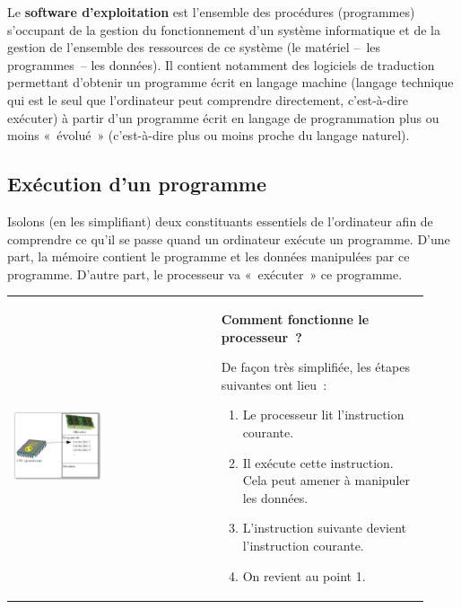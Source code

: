 			Le \textbf{software d’exploitation} 
			est l’ensemble des procédures (programmes) 
			s’occupant de la gestion du fonctionnement 
			d’un système informatique 
			et de la gestion de l’ensemble des ressources de ce système 
			(le matériel –~les programmes~– les données). 
			Il contient notamment des logiciels de traduction 
			permettant d’obtenir un programme écrit en langage machine 
			(langage technique qui est le seul que l’ordinateur 
			peut comprendre directement, c’est-à-dire exécuter) 
			à partir d’un programme écrit en langage de programmation 
			plus ou moins «~évolué~» 
			(c’est-à-dire plus ou moins proche du langage naturel).
	
		\subsection{Exécution d’un programme}
		
			Isolons (en les simplifiant) deux constituants essentiels de
			l’ordinateur afin de comprendre ce qu'il se passe quand un
			ordinateur exécute un programme.  D’une part, la mémoire contient le
			programme et les données manipulées par ce programme.  D’autre part,
			le processeur va «~exécuter~» ce programme.
	
			\begin{tabular}{m{0.46\linewidth}m{0.46\linewidth}}
				\begin{center}
				\includegraphics[width=0.45\textwidth]{images/intro-schema-ordi}
				\end{center}
			&
				\textbf{Comment fonctionne le processeur~?}
		
				De façon très simplifiée, les étapes suivantes ont lieu~:
		
				\medskip
				\begin{flushleft}
				\begin{enumerate}
				\item Le processeur lit l’instruction courante.
				\item Il exécute cette instruction. Cela peut amener à manipuler les données.
				\item L’instruction suivante devient l’instruction courante.
				\item On revient au point 1.
				\end{enumerate}
				\end{flushleft}
			\\
			\end{tabular}
	
